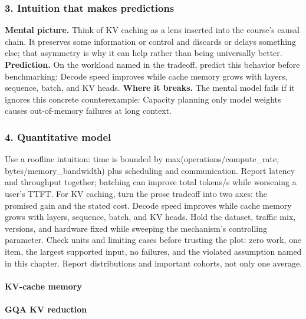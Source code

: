\subsubsection*{3. Intuition that makes predictions}
\textbf{Mental picture.} Think of KV caching as a lens inserted into the course's causal chain. It preserves some information or control and discards or delays something else; that asymmetry is why it can help rather than being universally better.
\textbf{Prediction.} On the workload named in the tradeoff, predict this behavior before benchmarking: Decode speed improves while cache memory grows with layers, sequence, batch, and KV heads.
\textbf{Where it breaks.} The mental model fails if it ignores this concrete counterexample: Capacity planning only model weights causes out-of-memory failures at long context.
\subsubsection*{4. Quantitative model}
Use a roofline intuition: time is bounded by max(operations/compute\_rate, bytes/memory\_bandwidth) plus scheduling and communication. Report latency and throughput together; batching can improve total tokens/s while worsening a user's TTFT.
For KV caching, turn the prose tradeoff into two axes: the promised gain and the stated cost. Decode speed improves while cache memory grows with layers, sequence, batch, and KV heads. Hold the dataset, traffic mix, versions, and hardware fixed while sweeping the mechanism's controlling parameter.
Check units and limiting cases before trusting the plot: zero work, one item, the largest supported input, no failures, and the violated assumption named in this chapter. Report distributions and important cohorts, not only one average.
\paragraph{KV-cache memory}
\paragraph{GQA KV reduction}
